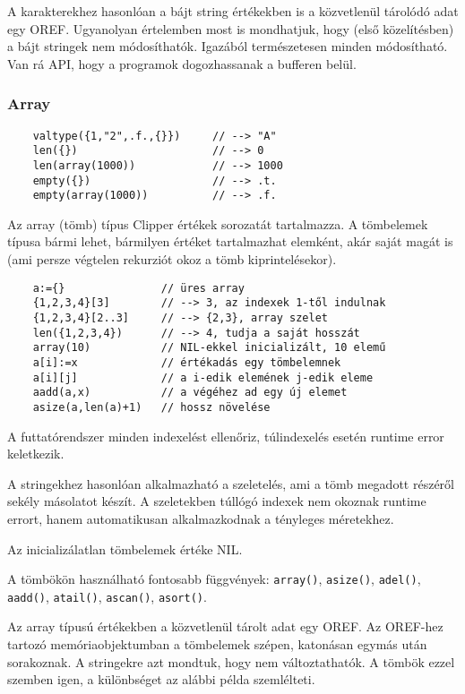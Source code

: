 A karakterekhez hasonlóan a bájt string értékekben is a közvetlenül tárolódó 
adat egy OREF. Ugyanolyan értelemben most is mondhatjuk, hogy (első közelítésben)
a bájt stringek nem módosíthatók.  Igazából természetesen minden módosítható.
Van rá API, hogy a programok dogozhassanak a bufferen belül.


\subsubsection{Array}

\begin{verbatim}
    valtype({1,"2",.f.,{}})     // --> "A"
    len({})                     // --> 0
    len(array(1000))            // --> 1000
    empty({})                   // --> .t.
    empty(array(1000))          // --> .f.
\end{verbatim}

Az array (tömb) típus Clipper értékek sorozatát tartalmazza.
A tömbelemek típusa bármi lehet, bármilyen értéket tartalmazhat
elemként, akár saját magát is (ami persze végtelen rekurziót okoz
a tömb kiprintelésekor).

\begin{verbatim}
    a:={}               // üres array
    {1,2,3,4}[3]        // --> 3, az indexek 1-től indulnak
    {1,2,3,4}[2..3]     // --> {2,3}, array szelet
    len({1,2,3,4})      // --> 4, tudja a saját hosszát
    array(10)           // NIL-ekkel inicializált, 10 elemű
    a[i]:=x             // értékadás egy tömbelemnek
    a[i][j]             // a i-edik elemének j-edik eleme
    aadd(a,x)           // a végéhez ad egy új elemet
    asize(a,len(a)+1)   // hossz növelése
\end{verbatim}

A futtatórendszer minden indexelést ellenőriz, 
túlindexelés esetén runtime error keletkezik. 

A stringekhez hasonlóan alkalmazható a szeletelés, ami a tömb megadott részéről
sekély másolatot készít. A szeletekben túllógó indexek nem okoznak runtime errort,
hanem automatikusan alkalmazkodnak a tényleges méretekhez.

Az inicializálatlan tömbelemek értéke NIL.

A tömbökön használható fontosabb függvények:
\verb!array()!,
\verb!asize()!,
\verb!adel()!,
\verb!aadd()!,
\verb!atail()!,
\verb!ascan()!,
\verb!asort()!.

Az array típusú értékekben a közvetlenül tárolt adat egy OREF.
Az OREF-hez tartozó memóriaobjektumban a tömbelemek szépen, 
katonásan egymás után sorakoznak.
A stringekre azt mondtuk, hogy nem változtathatók.
A tömbök ezzel szemben igen, a különbséget az alábbi példa
szemlélteti.

